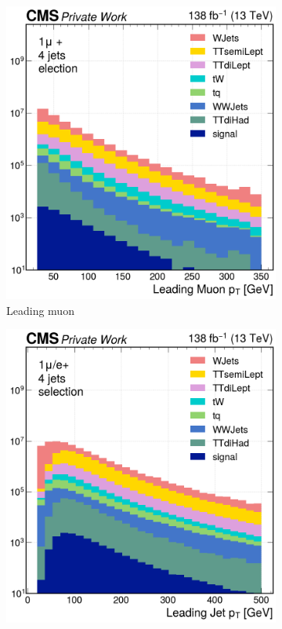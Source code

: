 \begin{figure}[H]
\begin{subfigure}{0.42\linewidth}
        \includegraphics[width=\linewidth]{fig//chap07-selection/selection/Leading_Muon_pt.png}
         \caption{Leading muon}
     \end{subfigure}
     \begin{subfigure}{0.42\linewidth}
        \includegraphics[width=\linewidth]{fig//chap07-selection/selection/Leading_Jet_pt.png}

\end{subfigure}
\end{figure}
